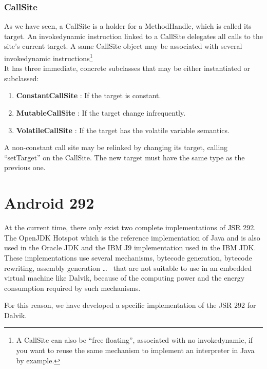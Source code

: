\documentclass{sig-alternate}
\def \DALVIK{Dalvik\xspace}
\def \Jsr{JSR\xspace}
\def \JSR{\Jsr 292\xspace}
\def \ANDROID{Android\xspace}
\begin{document}
    \subsubsection{CallSite}

      As we have seen, a CallSite is a holder for a MethodHandle, which is called its target.
      An invokedynamic instruction linked to a CallSite delegates all calls to the site's current target.
      A same CallSite object may be associated with several invokedynamic
      instructions\footnote{A CallSite can also be ``free floating'', associated with no invokedynamic,
      if you want to reuse the same mechanism to implement an interpreter in Java by example.}\\

      It has three immediate, concrete subclasses that may be either instantiated or subclassed:
      \begin{enumerate}
        \item \textbf{ConstantCallSite} : If the target is constant.
        \item \textbf{MutableCallSite}  : If the target change infrequently.
        \item \textbf{VolatileCallSite} : If the target has the volatile variable semantics.
      \end{enumerate}
      A non-constant call site may be relinked by changing its target, calling ``setTarget'' on the CallSite.
      The new target must have the same type as the previous one.

\section{\ANDROID 292}
  At the current time, there only exist two complete implementations of \JSR.
  The OpenJDK Hotspot which is the reference implementation of Java and is also used in the Oracle JDK
  and the IBM J9 implementation used in the IBM JDK.
  These implementations use several mechanisms, bytecode generation, bytecode rewriting, assembly generation
  \dots~\cite{jvmsummit-heidinga-mhimpl-2010}\cite{jvmsummit-heidinga-mhimpl-2011}\cite{jvmsummit-rose-mhimpl-2011}
  that are not suitable to use in an embedded virtual machine like \DALVIK,
  because of the computing power and the energy consumption required by such mechanisms.

  For this reason, we have developed a specific implementation of the \JSR for \DALVIK.
\end{document}
